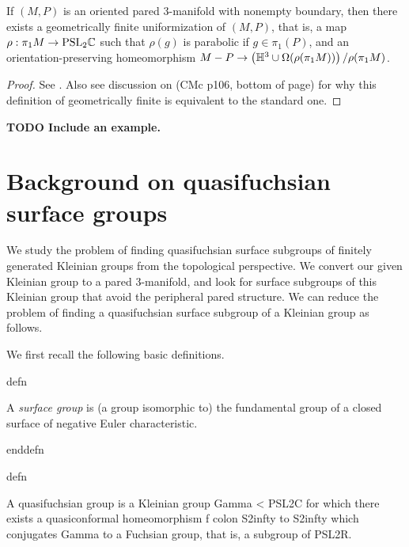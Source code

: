 
\begin{thm}

If $(M,P)$ is an oriented pared 3-manifold with nonempty boundary, then
there exists a geometrically finite uniformization of $(M,P)$, that is, a map
$\rho: \pi_1M \to \mbox{\rm{PSL}}_2\mathbb{C}$ such that $\rho(g)$ is parabolic
if $g \in \pi_1(P)$, and an orientation-preserving homeomorphism $M-P \to
\left(\mathbb{H}^3 \cup \Omega(\rho(\pi_1M))\right)/\rho(\pi_1M)$.

\end{thm}
\begin{proof}

See \cite{CMc}.
Also see discussion on (CMc p106, bottom of page) for why this definition of
geometrically finite is equivalent to the standard one.

\end{proof}


\textbf{ TODO Include an example.}

\section{Background on quasifuchsian surface groups}

We study the problem of finding quasifuchsian surface subgroups of finitely
generated Kleinian groups from the topological perspective. We convert our
given Kleinian group to a pared 3-manifold, and look for surface subgroups of
this Kleinian group that avoid the peripheral pared structure. We can reduce
the problem of finding a quasifuchsian surface subgroup of a Kleinian group as
follows.

We first recall the following basic definitions.

defn

A \emph{surface group} is (a group isomorphic to) the fundamental group of
a closed surface of negative Euler characteristic.

enddefn

defn

A {quasifuchsian group} is a Kleinian group Gamma < PSL2C for which there
exists a quasiconformal homeomorphism f colon S2infty to S2infty which
conjugates Gamma to a Fuchsian group, that is, a subgroup of PSL2R.

